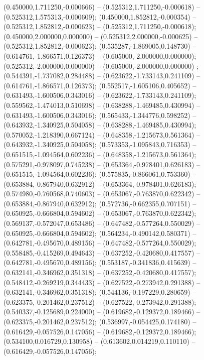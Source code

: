  (0.450000,1.711250,-0.000666) -- (0.525312,1.711250,-0.000618) -- (0.525312,1.575313,-0.000609);
 (0.450000,1.852812,-0.000354) -- (0.525312,1.852812,-0.000623) -- (0.525312,1.711250,-0.000618);
 (0.450000,2.000000,0.000000) -- (0.525312,2.000000,-0.000625) -- (0.525312,1.852812,-0.000623);
 (0.535287,-1.869005,0.148730) -- (0.614761,-1.866571,0.126373) -- (0.605000,-2.000000,0.000000);
 (0.525312,-2.000000,0.000000) -- (0.605000,-2.000000,0.000000) ;
 (0.544391,-1.737082,0.284488) -- (0.623622,-1.733143,0.241109) -- (0.614761,-1.866571,0.126373);
 (0.552517,-1.605106,0.405652) -- (0.631493,-1.600506,0.343016) -- (0.623622,-1.733143,0.241109);
 (0.559562,-1.474013,0.510698) -- (0.638288,-1.469485,0.430994) -- (0.631493,-1.600506,0.343016);
 (0.565433,-1.344776,0.598252) -- (0.643932,-1.340925,0.504058) -- (0.638288,-1.469485,0.430994);
 (0.570052,-1.218390,0.667124) -- (0.648358,-1.215673,0.561364) -- (0.643932,-1.340925,0.504058);
 (0.573353,-1.095843,0.716353) -- (0.651515,-1.094564,0.602236) -- (0.648358,-1.215673,0.561364);
 (0.575291,-0.978097,0.745238) -- (0.653364,-0.978401,0.626183) -- (0.651515,-1.094564,0.602236);
 (0.575835,-0.866061,0.753360) -- (0.653884,-0.867940,0.632912) -- (0.653364,-0.978401,0.626183);
 (0.574980,-0.760568,0.740603) -- (0.653067,-0.763870,0.622342) -- (0.653884,-0.867940,0.632912);
 (0.572736,-0.662355,0.707151) -- (0.650925,-0.666804,0.594602) -- (0.653067,-0.763870,0.622342);
 (0.569137,-0.572047,0.653486) -- (0.647482,-0.577264,0.550029) -- (0.650925,-0.666804,0.594602);
 (0.564234,-0.490142,0.580371) -- (0.642781,-0.495670,0.489156) -- (0.647482,-0.577264,0.550029);
 (0.558485,-0.415269,0.494643) -- (0.637252,-0.420680,0.417557) -- (0.642781,-0.495670,0.489156);
 (0.553187,-0.341836,0.415639) -- (0.632141,-0.346962,0.351318) -- (0.637252,-0.420680,0.417557);
 (0.548412,-0.269219,0.344433) -- (0.627522,-0.273942,0.291388) -- (0.632141,-0.346962,0.351318);
 (0.544136,-0.197229,0.280659) -- (0.623375,-0.201462,0.237512) -- (0.627522,-0.273942,0.291388);
 (0.540337,-0.125689,0.224000) -- (0.619682,-0.129372,0.189466) -- (0.623375,-0.201462,0.237512);
 (0.536997,-0.054425,0.174180) -- (0.616429,-0.057526,0.147056) -- (0.619682,-0.129372,0.189466);
 (0.534100,0.016729,0.130958) -- (0.613602,0.014219,0.110110) -- (0.616429,-0.057526,0.147056);
